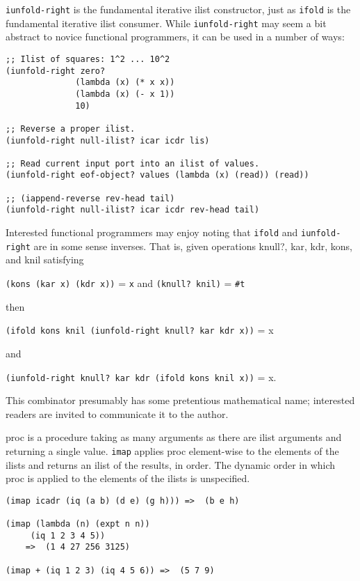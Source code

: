 \begin{description}
\texttt{iunfold-right} is the fundamental iterative ilist constructor,
just as \texttt{ifold} is the fundamental iterative ilist consumer.
While \texttt{iunfold-right} may seem a bit abstract to novice
functional programmers, it can be used in a number of ways:

\begin{verbatim}
;; Ilist of squares: 1^2 ... 10^2
(iunfold-right zero? 
              (lambda (x) (* x x))
              (lambda (x) (- x 1))
              10)
    
;; Reverse a proper ilist.
(iunfold-right null-ilist? icar icdr lis)

;; Read current input port into an ilist of values.
(iunfold-right eof-object? values (lambda (x) (read)) (read))

;; (iappend-reverse rev-head tail)
(iunfold-right null-ilist? icar icdr rev-head tail)
\end{verbatim}

Interested functional programmers may enjoy noting that \texttt{ifold}
and \texttt{iunfold-right} are in some sense inverses. That is, given
operations knull?, kar, kdr, kons, and knil satisfying

\texttt{(kons\ (kar\ x)\ (kdr\ x))} = \texttt{x} and
\texttt{(knull?\ knil)} = \texttt{\#t}

then

\texttt{(ifold\ kons\ knil\ (iunfold-right\ knull?\ kar\ kdr\ x))} = x

and

\texttt{(iunfold-right\ knull?\ kar\ kdr\ (ifold\ kons\ knil\ x))} = x.

This combinator presumably has some pretentious mathematical name;
interested readers are invited to communicate it to the author.
\item[ \href{}{} \texttt{imap} proc ilist\textsubscript{1}
ilist\textsubscript{2} \ldots{} -\textgreater{} ilist ]
proc is a procedure taking as many arguments as there are ilist
arguments and returning a single value. \texttt{imap} applies proc
element-wise to the elements of the ilists and returns an ilist of the
results, in order. The dynamic order in which proc is applied to the
elements of the ilists is unspecified.

\begin{verbatim}
(imap icadr (iq (a b) (d e) (g h))) =>  (b e h)

(imap (lambda (n) (expt n n))
     (iq 1 2 3 4 5))
    =>  (1 4 27 256 3125)

(imap + (iq 1 2 3) (iq 4 5 6)) =>  (5 7 9)


\end{verbatim}
\end{description}
